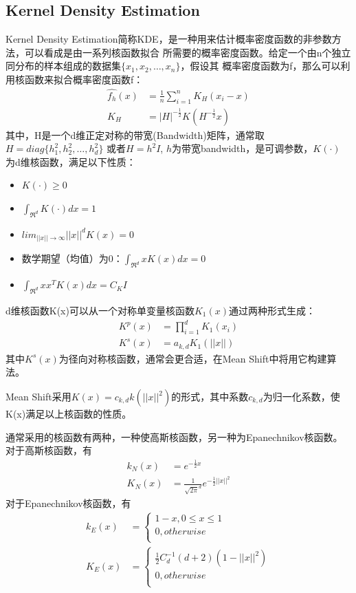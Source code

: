 \documentclass{article}
\begin{document}
\subsection{Kernel Density Estimation}
Kernel Density Estimation简称KDE，是一种用来估计概率密度函数的非参数方法，可以看成是由一系列核函数拟合
所需要的概率密度函数。给定一个由n个独立同分布的样本组成的数据集$ \{x_1, x_2, \ldots, x_n\} $，假设其
概率密度函数为f，那么可以利用核函数来拟合概率密度函数f：
\begin{align}
    \hat{f_h}(x) &= \frac{1}{n} {\sum}_{i=1}^nK_H(x_i - x) \\
    K_H &= |H|^{-\frac{1}{2}} K(H^{-\frac{1}{2}} x) 
\end{align}
其中，H是一个d维正定对称的带宽(Bandwidth)矩阵，通常取$ H = diag\{h_1^2, h_2^2, \ldots, h_d^2\} $
或者$ H = h^2I $, $h$为带宽bandwidth，是可调参数，$K(\cdot)$ 为d维核函数，满足以下性质：
\begin{itemize}
    \item $K(\cdot) \ge 0$
    \item $ {\int}_{{\Re}^d} K(\cdot)dx = 1 $
    \item $ {lim}_{||x|| \rightarrow \infty} ||x||^dK(x) = 0$
    \item 数学期望（均值）为0：$ {\int}_{{\Re}^d} xK(x)dx = 0 $
    \item $ {\int}_{{\Re}^d} xx^TK(x)dx = C_K I $
\end{itemize}
d维核函数K(x)可以从一个对称单变量核函数$K_1(x)$通过两种形式生成：
\begin{align}
    K^p(x) &= {\prod}_{i=1}^d K_1(x_i)\\
    K^s(x) &= a_{k, d}K_1(||x||)
\end{align}
其中$K^s(x)$为径向对称核函数，通常会更合适，在Mean Shift中将用它构建算法。

Mean Shift采用$K(x) = c_{k, d}k(||x||^2)$的形式，其中系数$c_{k, d}$为归一化系数，使K(x)满足以上核函数的性质。

通常采用的核函数有两种，一种使高斯核函数，另一种为Epanechnikov核函数。对于高斯核函数，有
\begin{align}
    k_N(x) &= e^{-\frac{1}{2}x} \\
    K_N(x) &= \frac{1}{{\sqrt{2\pi}}^d} e^{-\frac{1}{2}||x||^2}
\end{align}
对于Epanechnikov核函数，有
\begin{align}
    k_E(x) &= \begin{cases}
        1-x, 0 \leq x \leq 1 \\
        0, otherwise \\
    \end{cases} \\
    K_E(x) &= \begin{cases}
        \frac{1}{2} C_d^{-1}(d+2)(1-||x||^2) \\
        0, otherwise \\
    \end{cases}
\end{align}
\end{document}
